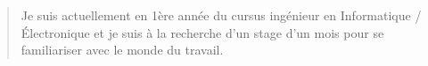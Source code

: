 \documentclass[10pt,a4paper,ragged2e,withhyper]{altacv}
\begin{document}
    \begin{paracol}{2}
    
            \begin{quote}
                Je suis actuellement en 1ère année du cursus ingénieur en Informatique / Électronique et je suis à la recherche d'un stage d'un mois pour se familiariser avec le monde du travail.
            \end{quote}
            
            \bigskip

            \smallskip
            \medskip
            
            \bigskip
        
        \smallskip
            \\
            \divider
        \bigskip
        \smallskip
        
        \smallskip
            \divider
            
            \divider
            
            \divider
            

        \newpage
        \switchcolumn
        

\end{paracol}
\end{document}
